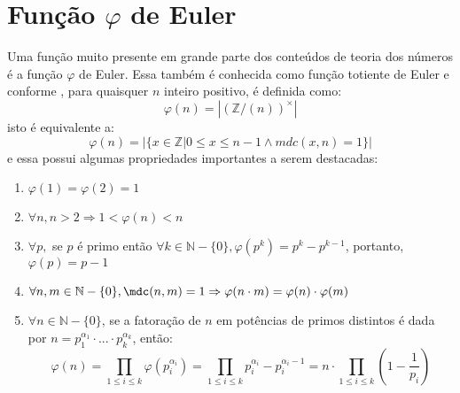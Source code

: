 
\section{Função $\varphi$ de Euler}

Uma função muito presente em grande parte dos conteúdos de teoria dos números é a função $\varphi$ de Euler. Essa também é conhecida como função totiente de Euler e conforme \cite[p.~48-49]{book:2399854}, para quaisquer $n$ inteiro positivo, é definida como:
    \begin{equation} \label{def:phi}
        \varphi(n) = |(\mathbb{Z}/(n))^{\times}|
    \end{equation}
isto é equivalente a:
    \begin{equation}
        \varphi(n) = |\{x \in \mathbb{Z} | 0 \leq x \leq n-1 \land mdc(x,n) = 1 \}|
    \end{equation}
e essa possui algumas propriedades importantes a serem destacadas:
    \begin{enumerate}
    \item $\varphi(1) = \varphi(2) = 1$
    \item \label{item:prop-phi-2} $\forall n, n > 2 \Rightarrow 1 < \varphi(n) < n$
    \item \label{item:prop-phi-3} $\forall p,$ se $p$ é primo então $\forall k \in \mathbb{N} - \{0\}, \varphi(p^k) = p^k - p^{k-1}$, portanto, $\varphi(p) = p - 1$
    \item \label{item:prop-phi-4} $\forall n, m \in \mathbb{N} - \{0\}, \mdc(n, m) = 1 \Rightarrow \varphi(n \cdot m) = \varphi(n) \cdot \varphi(m) $
    \item \label{item:prop-phi-5} $\forall n \in \mathbb{N} - \{0\}$, se a fatoração de $n$ em potências de primos distintos é dada por $n = p_{1}^{\alpha_{1}} \cdot ... \cdot p_{k}^{\alpha_{k}}$, então:
        \begin{equation} \label{lema:phi-formula}
            \varphi(n) = \prod_{1 \leq i \leq k} \varphi(p_{i}^{\alpha_{i}}) = \prod_{1 \leq i \leq k} p_{i}^{\alpha_{i}} - p_{i}^{\alpha_{i} - 1} = n \cdot \prod_{1 \leq i \leq k} \left( 1 - \frac{1}{p_{i}} \right)
        \end{equation}
    \end{enumerate}

